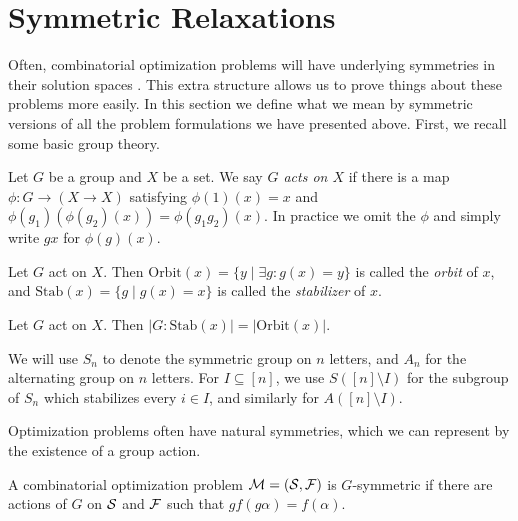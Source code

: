 \section{Symmetric Relaxations}
Often, combinatorial optimization problems will have underlying symmetries in their solution spaces . This extra structure allows us to prove things about these problems more easily.  In this section we define what we mean by symmetric versions of all the problem formulations we have presented above. First, we recall some basic group theory.
\begin{definition}
Let $G$ be a group and $X$ be a set. We say \emph{$G$ acts on $X$} if there is a map $\phi: G \rightarrow (X \rightarrow X)$ satisfying $\phi(1)(x) = x$ and $\phi(g_1)(\phi(g_2)(x)) = \phi(g_1g_2)(x)$. In practice we omit the $\phi$ and simply write $gx$ for $\phi(g)(x)$.
\end{definition}
\begin{definition}
Let $G$ act on $X$. Then $\text{Orbit}(x) = \{y \mid \exists g: g(x) = y\}$ is called the \emph{orbit} of $x$, and $\text{Stab}(x) = \{g \mid g(x) = x\}$ is called the \emph{stabilizer} of $x$.
\end{definition}
\begin{fact}
Let $G$ act on $X$. Then $|G: \text{Stab}(x)| = |\text{Orbit}(x)|$.
\end{fact}
We will use $S_n$ to denote the symmetric group on $n$ letters, and $A_n$ for the alternating group on $n$ letters. For $I \subseteq [n]$, we use $S([n] \setminus I)$ for the subgroup of $S_n$ which stabilizes every $i \in I$, and similarly for $A([n]\setminus I)$.

Optimization problems often have natural symmetries, which we can represent by the existence of a group action.
\begin{definition}
A combinatorial optimization problem $\mathcal M = (\mathcal S, \mathcal F)$ is $G$-symmetric if there are actions of $G$ on $\mathcal S$ and $\mathcal F$ such that $gf(g\alpha) = f(\alpha)$.
\end{definition}

